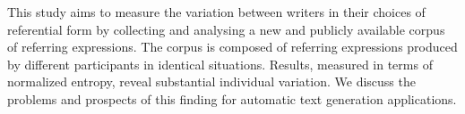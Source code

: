 This study aims to measure the variation between writers in their choices of referential form by collecting and analysing a new and publicly available corpus of referring expressions. The corpus is composed of referring expressions produced by different participants in identical situations. Results, measured in terms of normalized entropy, reveal substantial individual variation. We discuss the problems and prospects of this finding for automatic text generation applications.

